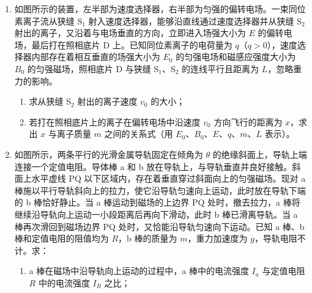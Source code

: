 \documentclass[\gkver]{gaokaozhenti}
\begin{document}
\begin{enumerate}
{
}

\item
如图所示的装置，左半部为速度选择器，右半部为匀强的偏转电场。一束同位素离子流从狭缝 S$_{1}$ 射入速度选择器，能够沿直线通过速度选择器并从狭缝 S$_{2}$ 射出的离子，又沿着与电场垂直的方向，立即进入场强大小为 $E$ 的偏转电场，最后打在照相底片 D 上。已知同位素离子的电荷量为 $q$（$q>0$），速度选择器内部存在着相互垂直的场强大小为 $E_{0}$ 的匀强电场和磁感应强度大小为 $B_{0}$ 的匀强磁场，照相底片 D 与狭缝 S$_{1}$、S$_{2}$ 的连线平行且距离为 $L$，忽略重力的影响。
\begin{enumerate}
	\item
	求从狭缝 S$_{2}$ 射出的离子速度 $v_{0}$ 的大小；

	\item
	若打在照相底片上的离子在偏转电场中沿速度 $v_{0}$ 方向飞行的距离为 $x$，求出 $x$ 与离子质量 $m$ 之间的关系式（用 $E_{0}$、$B_{0}$、$E$、$q$、$m$、$L$ 表示）。

\end{enumerate}



\item
如图所示，两条平行的光滑金属导轨固定在倾角为 $\theta$ 的绝缘斜面上，导轨上端连接一个定值电阻。导体棒 a 和 b 放在导轨上，与导轨垂直并良好接触。斜面上水平虚线 PQ 以下区域内，存在着垂直穿过斜面向上的匀强磁场。现对 a 棒施以平行导轨斜向上的拉力，使它沿导轨匀速向上运动，此时放在导轨下端的 b 棒恰好静止。当 a 棒运动到磁场的上边界 PQ 处时，撤去拉力，a 棒将继续沿导轨向上运动一小段距离后再向下滑动，此时 b 棒已滑离导轨。当 a 棒再次滑回到磁场边界 PQ 处时，又恰能沿导轨匀速向下运动。已知 a 棒、b 棒和定值电阻的阻值均为 $R$，b 棒的质量为 $m$，重力加速度为 $g$，导轨电阻不计。求：
\begin{enumerate}
	\item
	a 棒在磁场中沿导轨向上运动的过程中，a 棒中的电流强度 $I_{a}$ 与定值电阻 $R$ 中的电流强度 $I_{R}$ 之比；


\end{enumerate}
\end{enumerate}
\end{document}
